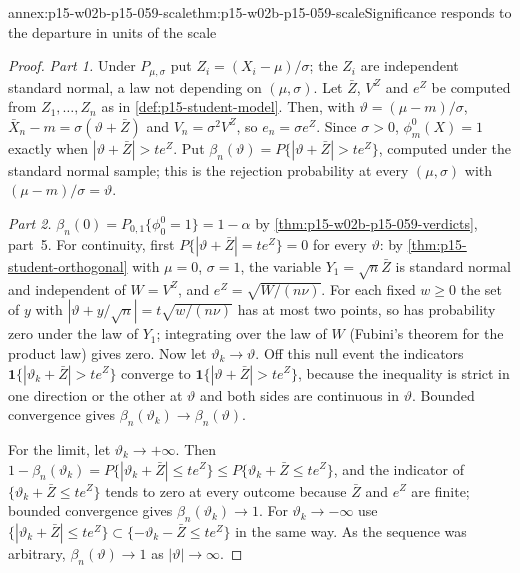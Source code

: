 \begin{annexitem}{annex:p15-w02b-p15-059-scale}{thm:p15-w02b-p15-059-scale}{Significance responds to the departure in units of the scale}
\begin{proof}
\emph{Part 1.} Under \(P_{\mu,\sigma}\) put \(Z_i=(X_i-\mu)/\sigma\); the
\(Z_i\) are independent standard normal, a law not depending on
\((\mu,\sigma)\). Let \(\bar Z\), \(V^Z\) and \(e^Z\) be computed from
\(Z_1,\ldots,Z_n\) as in \cref{def:p15-student-model}. Then, with
\(\vartheta=(\mu-m)/\sigma\), \(\bar X_n-m=\sigma(\vartheta+\bar Z)\) and
\(V_n=\sigma^2V^Z\), so \(e_n=\sigma e^Z\). Since \(\sigma>0\),
\(\phi_m^0(X)=1\) exactly when \(|\vartheta+\bar Z|>te^Z\). Put
\(\beta_n(\vartheta)=P\{|\vartheta+\bar Z|>te^Z\}\), computed under the
standard normal sample; this is the rejection probability at every
\((\mu,\sigma)\) with \((\mu-m)/\sigma=\vartheta\).

\emph{Part 2.} \(\beta_n(0)=P_{0,1}\{\phi_0^0=1\}=1-\alpha\) by
\cref{thm:p15-w02b-p15-059-verdicts}, part~5. For continuity, first
\(P\{|\vartheta+\bar Z|=te^Z\}=0\) for every \(\vartheta\): by
\cref{thm:p15-student-orthogonal} with \(\mu=0\), \(\sigma=1\), the
variable \(Y_1=\sqrt n\bar Z\) is standard normal and independent of
\(W=V^Z\), and \(e^Z=\sqrt{W/(n\nu)}\). For each fixed \(w\geq0\) the set
of \(y\) with \(|\vartheta+y/\sqrt n|=t\sqrt{w/(n\nu)}\) has at most two
points, so has probability zero under the law of \(Y_1\); integrating over
the law of \(W\) (Fubini's theorem for the product law) gives zero. Now
let \(\vartheta_k\to\vartheta\). Off this null event the indicators
\(\mathbf1\{|\vartheta_k+\bar Z|>te^Z\}\) converge to
\(\mathbf1\{|\vartheta+\bar Z|>te^Z\}\), because the inequality is strict
in one direction or the other at \(\vartheta\) and both sides are
continuous in \(\vartheta\). Bounded convergence gives
\(\beta_n(\vartheta_k)\to\beta_n(\vartheta)\).

For the limit, let \(\vartheta_k\to+\infty\). Then
\(1-\beta_n(\vartheta_k)=P\{|\vartheta_k+\bar Z|\leq te^Z\}\leq
P\{\vartheta_k+\bar Z\leq te^Z\}\), and the indicator of
\(\{\vartheta_k+\bar Z\leq te^Z\}\) tends to zero at every outcome because
\(\bar Z\) and \(e^Z\) are finite; bounded convergence gives
\(\beta_n(\vartheta_k)\to1\). For \(\vartheta_k\to-\infty\) use
\(\{|\vartheta_k+\bar Z|\leq te^Z\}\subset
\{-\vartheta_k-\bar Z\leq te^Z\}\) in the same way. As the sequence was
arbitrary, \(\beta_n(\vartheta)\to1\) as \(|\vartheta|\to\infty\).


\end{proof}
\end{annexitem}
